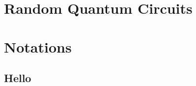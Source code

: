 \documentclass[11pt, oneside]{scrbook}
\begin{document}
\chapter{Random Quantum Circuits}

\appendix
\chapter{Notations}
\section{Hello}

\backmatter
\printbibliography[heading=bibintoc, title=Bibliography]
\end{document}
